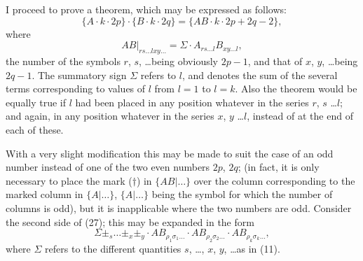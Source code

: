 \documentclass[11pt,a4paper]{book}
\begin{document}
\newpage
I proceed to prove a theorem, which may be expressed as follows:
\[
\{A \cdot k \cdot 2p\} \cdot \{B \cdot k \cdot 2q\} = \{AB \cdot k \cdot 2p + 2q - 2\}
\tag{27},
\]
where
\[
AB|_{rs\ldots lxy\ldots} = \Sigma \cdot A_{rs\ldots l} B_{xy\ldots l}
\tag{28},
\]
the number of the symbols $r$, $s$, \ldots being obviously $2p-1$, and that of $x$, $y$, \ldots being
$2q-1$. The summatory sign $\Sigma$ refers to $l$, and denotes the sum of the several terms
corresponding to values of $l$ from $l=1$ to $l=k$. Also the theorem would be equally
true if $l$ had been placed in any position whatever in the series $r$, $s$ \ldots $l$; and again,
in any position whatever in the series $x$, $y$ \ldots $l$, instead of at the end of each of these.

With a very slight modification this may be made to suit the case of an odd number
instead of one of the two even numbers $2p$, $2q$; (in fact, it is only necessary to place
the mark ($\dagger$) in $\{AB|\ldots\}$ over the column corresponding to the marked column in
$\{A|\ldots\}$, $\{A|\ldots\}$ being the symbol for which the number of columns is odd), but it is
inapplicable where the two numbers are odd. Consider the second side of (27); this
may be expanded in the form
\[
\Sigma \pm_s \ldots \pm_x \pm_y \cdot AB_{\rho_1\sigma_1\ldots} \cdot AB_{\rho_2\sigma_2\ldots} \cdot AB_{\rho_k\sigma_k\ldots}
\tag{29},
\]
where $\Sigma$ refers to the different quantities $s$, \ldots, $x$, $y$, \ldots as in (11).
\end{document}

